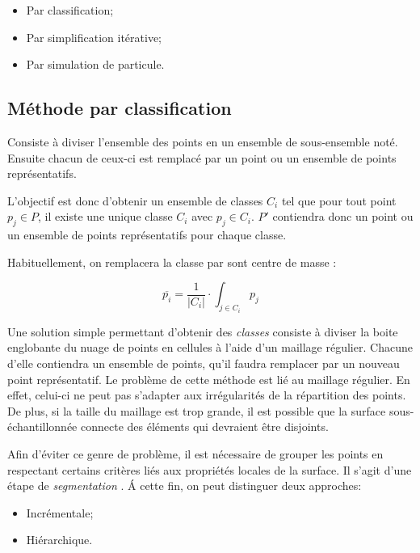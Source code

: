 \begin{itemize}
  \item Par classification;
  \item Par simplification itérative;
  \item Par simulation de particule.
\end{itemize}

\subsection{Méthode par classification}
\begin{definition}
  Consiste à diviser l'ensemble des points en un ensemble de sous-ensemble noté. Ensuite chacun de ceux-ci est remplacé par un point ou un ensemble de points représentatifs.
\end{definition}

L'objectif est donc d'obtenir un ensemble de classes ${C_i}$ tel que pour tout point $p_j\in P$, il existe une unique classe $C_i$ avec $p_j\in C_i$. $P'$ contiendra donc un point ou un ensemble de points représentatifs pour chaque classe.

Habituellement, on remplacera la classe par sont centre de masse :

$$\overline{p_i}=\frac{1}{|C_i|}\cdot\int_{j\in C_i}p_j$$

Une solution simple permettant d'obtenir des \emph{classes} consiste à diviser la boite englobante du nuage de points en cellules à l'aide d'un maillage régulier. Chacune d'elle contiendra un ensemble de points, qu'il faudra remplacer par un nouveau point représentatif.
Le problème de cette méthode est lié au maillage régulier. En effet, celui-ci ne peut pas s'adapter aux irrégularités de la répartition des points. De plus, si la taille du maillage est trop grande, il est possible que la surface sous-échantillonnée connecte des éléments qui devraient être disjoints.

Afin d'éviter ce genre de problème, il est nécessaire de grouper les points en respectant certains critères liés aux propriétés locales de la surface. Il s'agit d'une étape de \emph{segmentation} . \'{A} cette fin, on peut distinguer deux approches:

\begin{itemize}
  \item Incrémentale;
  \item Hiérarchique.
\end{itemize}

